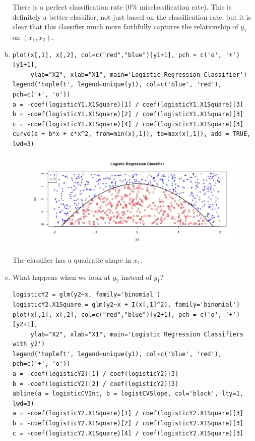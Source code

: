 \documentclass[12pt]{article}
\begin{document}
\begin{enumerate}[(a)]
\begin{table}[H]
\begin{tabular}{ccc}
\end{tabular}
\end{table}
There is a perfect classification rate (0\% misclassification rate). This is definitely a better classifier, not just based on the classification rate, but it is clear that this classifier much more faithfully captures the relationship of  $y_1$ on $(x_1, x_2)$.
\item 
\begin{lstlisting}
plot(x[,1], x[,2], col=c("red","blue")[y1+1], pch = c('o', '+')[y1+1], 
     ylab="X2", xlab="X1", main='Logistic Regression Classifier')
legend('topleft', legend=unique(y1), col=c('blue', 'red'), pch=c('+', 'o'))
a = -coef(logisticY1.X1Square)[1] / coef(logisticY1.X1Square)[3]
b = -coef(logisticY1.X1Square)[2] / coef(logisticY1.X1Square)[3]
c = -coef(logisticY1.X1Square)[4] / coef(logisticY1.X1Square)[3]
curve(a + b*x + c*x^2, from=min(x[,1]), to=max(x[,1]), add = TRUE, lwd=3)
\end{lstlisting}
\begin{figure}[H] \center
\includegraphics[scale=.4]{y1_plot3.jpeg}
\end{figure}
The classifier has a quadratic shape in $x_1$.
\item What happens when we look at $y_2$ instead of $y_1$?
\begin{lstlisting}
logisticY2 = glm(y2~x, family='binomial')
logisticY2.X1Square = glm(y2~x + I(x[,1]^2), family='binomial')
plot(x[,1], x[,2], col=c("red","blue")[y2+1], pch = c('o', '+')[y2+1], 
     ylab="X2", xlab="X1", main='Logistic Regression Classifiers with y2')
legend('topleft', legend=unique(y1), col=c('blue', 'red'), pch=c('+', 'o'))
a = -coef(logisticY2)[1] / coef(logisticY2)[3]
b = -coef(logisticY2)[2] / coef(logisticY2)[3]
abline(a = logisticCVInt, b = logistCVSlope, col='black', lty=1, lwd=3)
a = -coef(logisticY2.X1Square)[1] / coef(logisticY2.X1Square)[3]
b = -coef(logisticY2.X1Square)[2] / coef(logisticY2.X1Square)[3]
c = -coef(logisticY2.X1Square)[4] / coef(logisticY2.X1Square)[3]

\end{lstlisting}
\end{enumerate}
\end{document}

